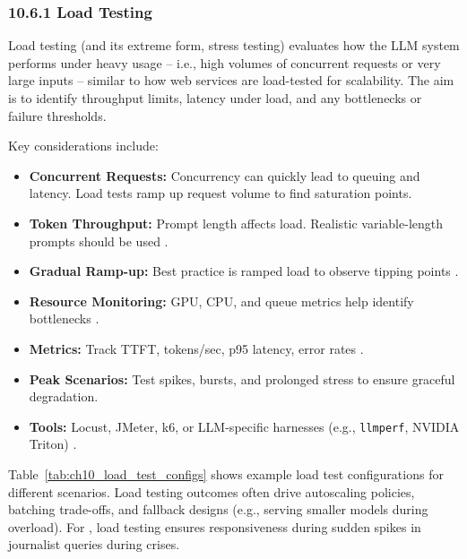 \subsubsection*{10.6.1 Load Testing}
Load testing (and its extreme form, stress testing) evaluates how the LLM system performs under heavy usage – i.e., high volumes of concurrent requests or very large inputs – similar to how web services are load-tested for scalability. The aim is to identify throughput limits, latency under load, and any bottlenecks or failure thresholds.  

Key considerations include:  
\begin{itemize}
    \item \textbf{Concurrent Requests:} Concurrency can quickly lead to queuing and latency. Load tests ramp up request volume to find saturation points.  
    \item \textbf{Token Throughput:} Prompt length affects load. Realistic variable-length prompts should be used \cite{posta1}.  
    \item \textbf{Gradual Ramp-up:} Best practice is ramped load to observe tipping points \cite{posta1}.  
    \item \textbf{Resource Monitoring:} GPU, CPU, and queue metrics help identify bottlenecks \cite{posta1}.  
    \item \textbf{Metrics:} Track TTFT, tokens/sec, p95 latency, error rates \cite{posta1}.  
    \item \textbf{Peak Scenarios:} Test spikes, bursts, and prolonged stress to ensure graceful degradation.  
    \item \textbf{Tools:} Locust, JMeter, k6, or LLM-specific harnesses (e.g., \texttt{llmperf}, NVIDIA Triton) \cite{posta1}.  
\end{itemize}

Table~\ref{tab:ch10_load_test_configs} shows example load test configurations for different scenarios. Load testing outcomes often drive autoscaling policies, batching trade-offs, and fallback designs (e.g., serving smaller models during overload). For \ishtar{}, load testing ensures responsiveness during sudden spikes in journalist queries during crises.

